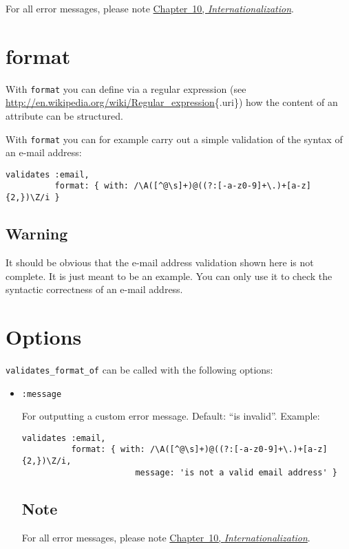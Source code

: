 \documentclass[a4paper]{book}
\begin{document}
For all error messages, please note \hyperref[i18n]{Chapter~10, \emph{Internationalization}}.

\section{format}\label{format}

With \texttt{format} you can define via a regular expression (see \url{http://en.wikipedia.org/wiki/Regular_expression}\{.uri\}) how the content of an attribute can be structured.

With \texttt{format} you can for example carry out a simple validation of the syntax of an e-mail address:

\begin{shaded}\begin{verbatim}
validates :email,
          format: { with: /\A([^@\s]+)@((?:[-a-z0-9]+\.)+[a-z]{2,})\Z/i }
\end{verbatim}\end{shaded}

\subsection{Warning}\label{warning-8}

It should be obvious that the e-mail address validation shown here is not complete. It is just meant to be an example. You can only use it to check the syntactic correctness of an e-mail address.

\section{Options}\label{options-8}

\texttt{validates\_format\_of} can be called with the following options:

\begin{itemize}
\item
  \texttt{:message}

  For outputting a custom error message. Default: “is invalid”. Example:

\begin{shaded}\begin{verbatim}
validates :email,
          format: { with: /\A([^@\s]+)@((?:[-a-z0-9]+\.)+[a-z]{2,})\Z/i,
                       message: 'is not a valid email address' }
\end{verbatim}\end{shaded}

  \subsection{Note}\label{note-31}

  For all error messages, please note \hyperref[i18n]{Chapter~10, \emph{Internationalization}}.
\end{itemize}
\end{document}
